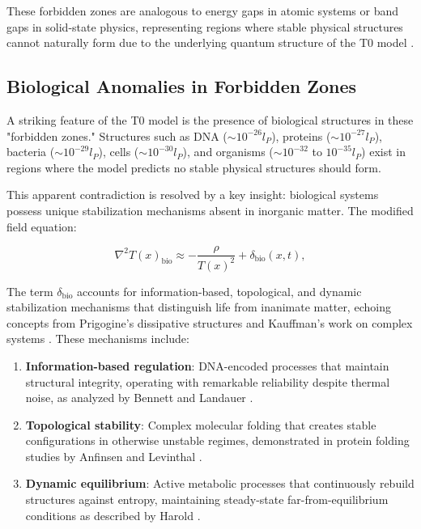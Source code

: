 \documentclass[twocolumn,aps,prl]{revtex4-2}
\begin{document}
	These forbidden zones are analogous to energy gaps in atomic systems or band gaps in solid-state physics, representing regions where stable physical structures cannot naturally form due to the underlying quantum structure of the T0 model \cite{pascher_higgs_2025}.
	
	\subsection{Biological Anomalies in Forbidden Zones}
	\label{subsec:bio_anomalies}
	
	A striking feature of the T0 model is the presence of biological structures in these "forbidden zones." Structures such as DNA ($\sim 10^{-26} l_P$), proteins ($\sim 10^{-27} l_P$), bacteria ($\sim 10^{-29} l_P$), cells ($\sim 10^{-30} l_P$), and organisms ($\sim 10^{-32}$ to $10^{-35} l_P$) exist in regions where the model predicts no stable physical structures should form.
	
	This apparent contradiction is resolved by a key insight: biological systems possess unique stabilization mechanisms absent in inorganic matter. The modified field equation:
	
	\begin{equation}
		\nabla^2 T(x)_{\text{bio}} \approx -\frac{\rho}{T(x)^2} + \delta_{\text{bio}}(x,t), \label{eq:bio_field_eq}
	\end{equation}
	
	The term $\delta_{\text{bio}}$ accounts for information-based, topological, and dynamic stabilization mechanisms that distinguish life from inanimate matter, echoing concepts from Prigogine's dissipative structures \cite{Prigogine1980} and Kauffman's work on complex systems \cite{Kauffman1993}. These mechanisms include:
	
	\begin{enumerate}
		\item \textbf{Information-based regulation}: DNA-encoded processes that maintain structural integrity, operating with remarkable reliability despite thermal noise, as analyzed by Bennett \cite{Bennett1982} and Landauer \cite{Landauer1961}.
		\item \textbf{Topological stability}: Complex molecular folding that creates stable configurations in otherwise unstable regimes, demonstrated in protein folding studies by Anfinsen \cite{Anfinsen1973} and Levinthal \cite{Levinthal1968}.
		\item \textbf{Dynamic equilibrium}: Active metabolic processes that continuously rebuild structures against entropy, maintaining steady-state far-from-equilibrium conditions as described by Harold \cite{Harold2001}.
	\end{enumerate}
	
\end{document}
